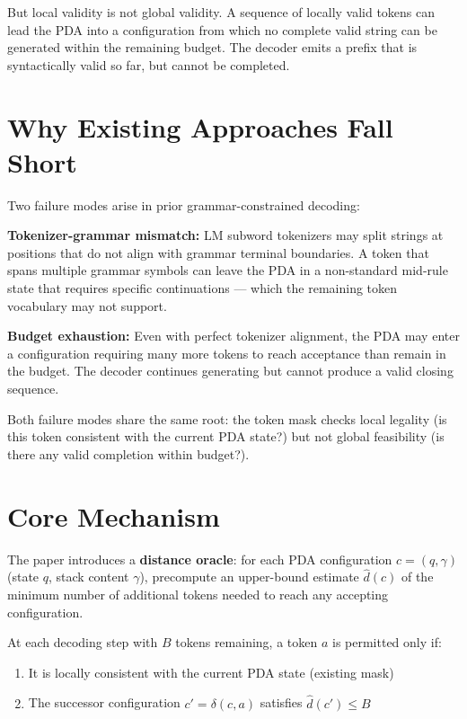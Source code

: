 \documentclass[10pt,twocolumn]{article}
\begin{document}
But local validity is not global validity. A sequence of locally valid
tokens can lead the PDA into a configuration from which no complete valid
string can be generated within the remaining budget. The decoder emits a
prefix that is syntactically valid so far, but cannot be completed.

\section{Why Existing Approaches Fall Short}

Two failure modes arise in prior grammar-constrained decoding:

\textbf{Tokenizer-grammar mismatch:} LM subword tokenizers may split
strings at positions that do not align with grammar terminal boundaries.
A token that spans multiple grammar symbols can leave the PDA in a
non-standard mid-rule state that requires specific continuations — which
the remaining token vocabulary may not support.

\textbf{Budget exhaustion:} Even with perfect tokenizer alignment, the
PDA may enter a configuration requiring many more tokens to reach
acceptance than remain in the budget. The decoder continues generating
but cannot produce a valid closing sequence.

Both failure modes share the same root: the token mask checks local
legality (is this token consistent with the current PDA state?) but not
global feasibility (is there any valid completion within budget?).

\section{Core Mechanism}

The paper introduces a \textbf{distance oracle}: for each PDA configuration
$c = (q, \gamma)$ (state $q$, stack content $\gamma$), precompute an
upper-bound estimate $\hat{d}(c)$ of the minimum number of additional
tokens needed to reach any accepting configuration.

At each decoding step with $B$ tokens remaining, a token $a$ is permitted
only if:
\begin{enumerate}[itemsep=2pt,parsep=0pt]
  \item It is locally consistent with the current PDA state (existing mask)
  \item The successor configuration $c' = \delta(c, a)$ satisfies
    $\hat{d}(c') \leq B$
\end{enumerate}
\end{document}

